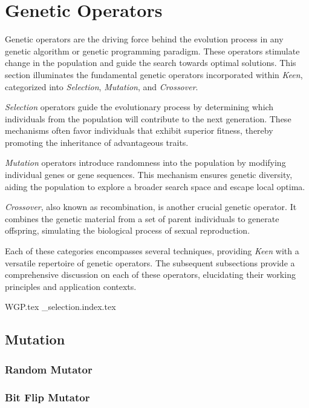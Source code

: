 
\section{Genetic Operators}
\label{sec:keen:operators}
  Genetic operators are the driving force behind the evolution process in any
  genetic algorithm or genetic programming paradigm.
  These operators stimulate change in the population and guide the search
  towards optimal solutions.
  This section illuminates the fundamental genetic operators incorporated within
  \textit{Keen}, categorized into \textit{Selection}, \textit{Mutation}, and
  \textit{Crossover}.

  \textit{Selection} operators guide the evolutionary process by determining
  which individuals from the population will contribute to the next generation.
  These mechanisms often favor individuals that exhibit superior fitness, 
  thereby promoting the inheritance of advantageous traits.

  \textit{Mutation} operators introduce randomness into the population by 
  modifying individual genes or gene sequences.
  This mechanism ensures genetic diversity, aiding the population to explore a 
  broader search space and escape local optima.

  \textit{Crossover}, also known as recombination, is another crucial genetic 
  operator.
  It combines the genetic material from a set of parent individuals to generate
  offspring, simulating the biological process of sexual reproduction.

  Each of these categories encompasses several techniques, providing
  \textit{Keen} with a versatile repertoire of genetic operators.
  The subsequent subsections provide a comprehensive discussion on each of these
  operators, elucidating their working principles and application contexts.

  {WGP.tex}
  {_selection.index.tex}
  \subsection{Mutation}
  \label{sec:keen:operators:mutation}

    \subsubsection{Random Mutator}
    \label{sec:keen:operators:mutation:simple}
      \Blindtext
    \subsubsection{Bit Flip Mutator}
    \label{sec:keen:operators:mutation:bit_flip}
      \Blindtext
